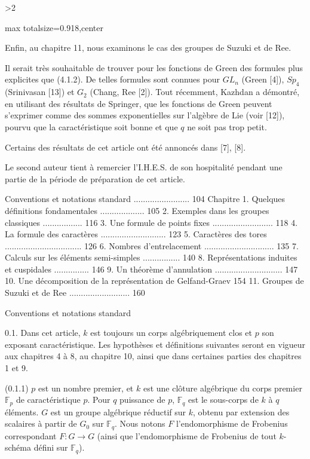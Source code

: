 \documentclass[9pt,twoside]{extarticle}
\newcommand{\EditionHeading}[1]{\par\medskip{\noindent\centering\large\bfseries #1\par}\smallskip}
\newcommand{\EditionPage}[3]{%
  \ifnum#1>2\clearpage\fi
  \pdfbookmark[1]{Printed page #2}{fr-folio-#2}%
  \hypertarget{fr-physical-#1}{}%
  \noindent\begin{adjustbox}{max totalsize={\textwidth}{0.918\textheight},center}
  \begin{minipage}[t]{\textwidth}
  \fontsize{9.4}{11.1}\selectfont\justifying
  #3
  \end{minipage}
  \end{adjustbox}%
}
\begin{document}
\EditionPage{3}{104}{%
Enfin, au chapitre 11, nous examinons le cas des groupes de Suzuki et de Ree.\par

Il serait très souhaitable de trouver pour les fonctions de Green des formules plus explicites que (4.1.2). De telles formules sont connues pour \(GL_n\) (Green [4]), \(Sp_4\) (Srinivasan [13]) et \(G_2\) (Chang, Ree [2]). Tout récemment, Kazhdan a démontré, en utilisant des résultats de Springer, que les fonctions de Green peuvent s'exprimer comme des sommes exponentielles sur l'algèbre de Lie (voir [12]), pourvu que la caractéristique soit bonne et que \(q\) ne soit pas trop petit.\par

Certains des résultats de cet article ont été annoncés dans [7], [8].\par

Le second auteur tient à remercier l'I.H.E.S. de son hospitalité pendant une partie de la période de préparation de cet article.\par

\EditionHeading{TABLE DES MATIÈRES}

Conventions et notations standard ........................ 104 Chapitre 1. Quelques définitions fondamentales ................... 105 2. Exemples dans les groupes classiques ................. 116 3. Une formule de points fixes .......................... 118 4. La formule des caractères ............................ 123 5. Caractères des tores ................................. 126 6. Nombres d'entrelacement .............................. 135 7. Calculs sur les éléments semi-simples ................ 140 8. Représentations induites et cuspidales ............... 146 9. Un théorème d'annulation ............................. 147 10. Une décomposition de la représentation de Gelfand-Graev 154 11. Groupes de Suzuki et de Ree .......................... 160\par

Conventions et notations standard\par

0.1. Dans cet article, \(k\) est toujours un corps algébriquement clos et \(p\) son exposant caractéristique. Les hypothèses et définitions suivantes seront en vigueur aux chapitres 4 à 8, au chapitre 10, ainsi que dans certaines parties des chapitres 1 et 9.\par

(0.1.1) \(p\) est un nombre premier, et \(k\) est une clôture algébrique du corps premier \(\mathbb{F}_p\) de caractéristique \(p\). Pour \(q\) puissance de \(p\), \(\mathbb{F}_q\) est le sous-corps de \(k\) à \(q\) éléments. \(G\) est un groupe algébrique réductif sur \(k\), obtenu par extension des scalaires à partir de \(G_0\) sur \(\mathbb{F}_q\). Nous notons \(F\) l'endomorphisme de Frobenius correspondant \(F:G\to G\) (ainsi que l'endomorphisme de Frobenius de tout \(k\)-schéma défini sur \(\mathbb{F}_q\)).\par

}
\end{document}
